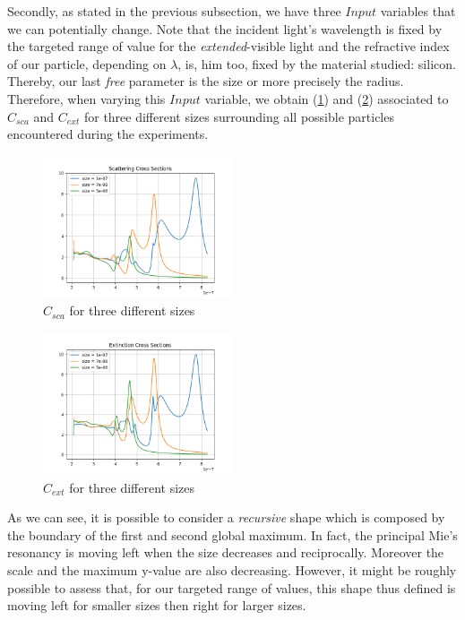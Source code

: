 \documentclass{article}
\numberwithin{equation}{section}
\begin{document}
Secondly, as stated in the previous subsection, we have three $Input$ variables that we can potentially change. Note that the incident light's wavelength is fixed by the targeted range of value for the \textit{extended}-visible light and the refractive index of our particle, depending on $\lambda$, is, him too, fixed by the material studied: silicon. Thereby, our last \textit{free} parameter is the size or more precisely the radius. Therefore, when varying this $Input$ variable, we obtain (\ref{fig:sca_var}) and (\ref{fig:ext_var}) associated to $C_{sca}$ and $C_{ext}$ for three different sizes surrounding all possible particles encountered during the experiments.
\begin{figure}[h]
    \centering
    \includegraphics[width=0.5\textwidth, height=0.4\textwidth]{sca_var.png}
    \caption{$C_{sca}$ for three different sizes}
    \label{fig:sca_var}
\end{figure}
\begin{figure}[h]
    \centering
    \includegraphics[width=0.5\textwidth, height=0.4\textwidth]{ext_var.png}
    \caption{$C_{ext}$ for three different sizes}
    \label{fig:ext_var}
\end{figure}
As we can see, it is possible to consider a \textit{recursive} shape which is composed by the boundary of the first and second global maximum. In fact, the principal Mie's resonancy is moving left when the size decreases and reciprocally. Moreover the scale and the maximum y-value are also decreasing. However, it might be roughly possible to assess that, for our targeted range of values, this shape thus defined is moving left for smaller sizes then right for larger sizes.
\end{document}
